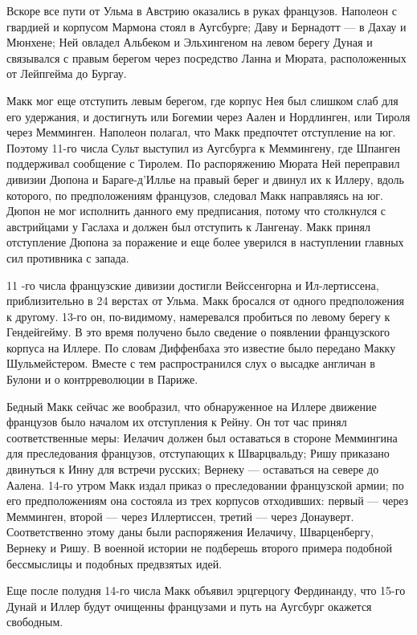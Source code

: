 \documentclass[
  oneside,
  12pt,
  titlepage]{book}
\begin{document}
Вскоре все пути от Ульма в Австрию оказались в руках французов. Наполеон с гвардией и корпусом Мармона стоял в Аугсбурге; Даву и Бернадотт --- в Дахау и Мюнхене; Ней овладел Альбеком и Эльхингеном на левом берегу Дуная и связывался с правым берегом через посредство Ланна и Мюрата, расположенных от Лейпгейма до Бургау.

Макк мог еще отступить левым берегом, где корпус Нея был слишком слаб для его удержания, и достигнуть или Богемии через Аален и Нордлинген, или Тироля через Мемминген. Наполеон полагал, что Макк предпочтет отступление на юг. Поэтому 11-го числа Сульт выступил из Аугсбурга к Меммингену, где Шпанген поддерживал сообщение с Тиролем. По распоряжению Мюрата Ней переправил дивизии Дюпона и Бараге-д'Иллье на правый берег и двинул их к Иллеру, вдоль которого, по предположениям французов, следовал Макк направляясь на юг. Дюпон не мог исполнить данного ему предписания, потому что столкнулся с австрийцами у Гаслаха и должен был отступить к Лангенау. Макк принял отступление Дюпона за поражение и еще более уверился в наступлении главных сил противника с запада.

11 -го числа французские дивизии достигли Вейссенгорна и Ил-лертиссена, приблизительно в 24 верстах от Ульма. Макк бросался от одного предположения к другому. 13-го он, по-видимому, намеревался пробиться по левому берегу к Гендейгейму. В это время получено было сведение о появлении французского корпуса на Иллере. По словам Диффенбаха это известие было передано Макку Шульмейстером. Вместе с тем распространился слух о высадке англичан в Булони и о контрреволюции в Париже.

Бедный Макк сейчас же вообразил, что обнаруженное на Иллере движение французов было началом их отступления к Рейну. Он тот час принял соответственные меры: Иелачич должен был оставаться в стороне Меммингина для преследования французов, отступающих к Шварцвальду; Ришу приказано двинуться к Инну для встречи русских; Вернеку --- оставаться на севере до Аалена. 14-го утром Макк издал приказ о преследовании французской армии; по его предположениям она состояла из трех корпусов отходивших: первый --- через Мемминген, второй --- через Иллертиссен, третий --- через Донауверт. Соответственно этому даны были распоряжения Иелачичу, Шварценбергу, Вернеку и Ришу. В военной истории не подберешь второго примера подобной бессмыслицы и подобных предвзятых идей.

Еще после полудня 14-го числа Макк объявил эрцгерцогу Фердинанду, что 15-го Дунай и Иллер будут очищенны французами и путь на Аугсбург окажется свободным.
\end{document}
